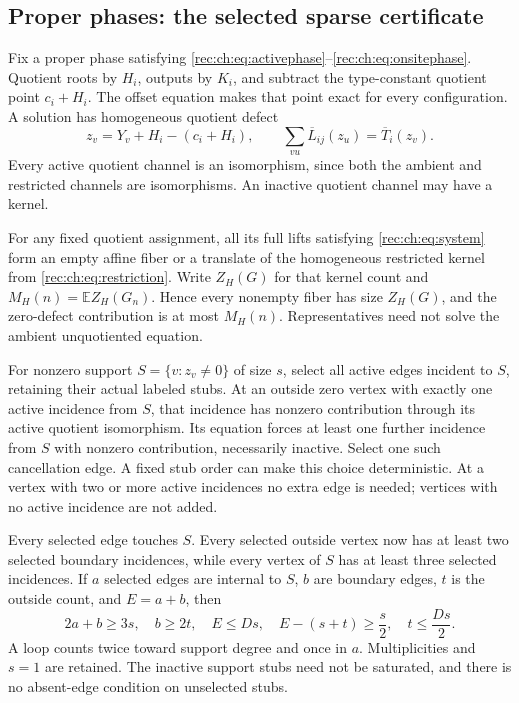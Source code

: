 \documentclass[11pt]{article}
\theoremstyle{definition}
\theoremstyle{remark}
\newcommand{\E}{\mathbb E}
\newcommand{\1}{\mathbf 1}
\begin{document}
\subsection{Proper phases: the selected sparse certificate}
Fix a proper phase satisfying \eqref{rec:ch:eq:activephase}--\eqref{rec:ch:eq:onsitephase}. Quotient roots by $H_i$, outputs by $K_i$, and subtract the type-constant quotient point $c_i+H_i$. The offset equation makes that point exact for every configuration. A solution has homogeneous quotient defect
\begin{equation}\label{rec:ch:eq:quotient}
 z_v=Y_v+H_i-(c_i+H_i),\qquad
 \sum_{vu}\overline L_{ij}(z_u)=\overline T_i(z_v).
\end{equation}
Every active quotient channel is an isomorphism, since both the ambient and restricted channels are isomorphisms. An inactive quotient channel may have a kernel.

For any fixed quotient assignment, all its full lifts satisfying \eqref{rec:ch:eq:system} form an empty affine fiber or a translate of the homogeneous restricted kernel from \eqref{rec:ch:eq:restriction}. Write $Z_H(G)$ for that kernel count and $M_H(n)=\E Z_H(G_n)$. Hence every nonempty fiber has size $Z_H(G)$, and the zero-defect contribution is at most $M_H(n)$. Representatives need not solve the ambient unquotiented equation.

For nonzero support $S=\{v:z_v\ne0\}$ of size $s$, select all active edges incident to $S$, retaining their actual labeled stubs. At an outside zero vertex with exactly one active incidence from $S$, that incidence has nonzero contribution through its active quotient isomorphism. Its equation forces at least one further incidence from $S$ with nonzero contribution, necessarily inactive. Select one such cancellation edge. A fixed stub order can make this choice deterministic. At a vertex with two or more active incidences no extra edge is needed; vertices with no active incidence are not added.

Every selected edge touches $S$. Every selected outside vertex now has at least two selected boundary incidences, while every vertex of $S$ has at least three selected incidences. If $a$ selected edges are internal to $S$, $b$ are boundary edges, $t$ is the outside count, and $E=a+b$, then
\begin{equation}\label{rec:ch:eq:excess}
 2a+b\ge3s,\quad b\ge2t,\quad E\le Ds,\quad
 E-(s+t)\ge\frac{s}{2},\quad t\le\frac{Ds}{2}.
\end{equation}
A loop counts twice toward support degree and once in $a$. Multiplicities and $s=1$ are retained. The inactive support stubs need not be saturated, and there is no absent-edge condition on unselected stubs.
\end{document}
